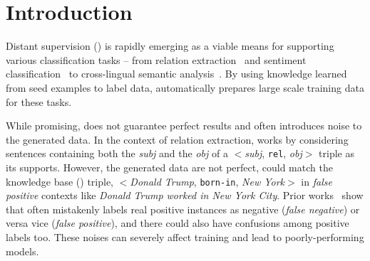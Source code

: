 \section{Introduction}

Distant supervision (\DS) is rapidly emerging as a viable means for supporting various classification tasks -- from relation extraction~\cite{mintz2009distant} and sentiment classification~\cite{go2009twitter} to cross-lingual semantic
analysis~\cite{fang2016learning}.
By using knowledge learned from seed examples to label data, \DS automatically prepares large scale training data for these tasks.




While promising, \DS does not guarantee perfect results and often introduces noise to the
generated data. In the context of relation extraction, 
\DS works by considering sentences containing both the \emph{subj} and the \emph{obj} of a $<$\emph{subj}, \texttt{rel}, \emph{obj}$>$ triple as its supports. However, the generated data are not perfect, 
\DS could match the knowledge base (\KB) triple, $<$\emph{Donald Trump},
\texttt{born-in}, \emph{New York}$>$  in \emph{false positive} contexts like \emph{Donald Trump worked in New York City}.
Prior works~\cite{takamatsu2012reducing,ritter2013modeling} show that \DS often mistakenly labels real positive instances as negative (\emph{false negative}) or
versa vice (\emph{false positive}), and there could also have confusions among positive labels too. These noises can
severely affect training and lead to poorly-performing models.


